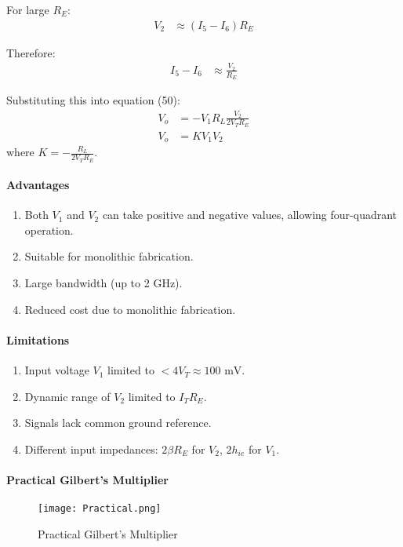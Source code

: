 \documentclass[a4paper,9pt,twoside,openany,twocolumn]{memoir}
\begin{document}
For large \( R_E \):
\begin{align}
V_2 &\approx (I_5 - I_6) R_E \tag{59}
\end{align}

Therefore:
\begin{align}
I_5 - I_6 &\approx \frac{V_2}{R_E} \tag{60}
\end{align}

Substituting this into equation (50):
\begin{align}
V_o &= -V_1 R_L \frac{V_2}{2V_T R_E} \tag{61} \\
V_o &= K V_1 V_2 \tag{62}
\end{align}
where \( K = -\frac{R_L}{2V_T R_E} \).

\paragraph{Advantages}
\begin{enumerate}
    \item Both \( V_1 \) and \( V_2 \) can take positive and negative values, allowing four-quadrant operation.
    \item Suitable for monolithic fabrication.
    \item Large bandwidth (up to 2 GHz).
    \item Reduced cost due to monolithic fabrication.
\end{enumerate}

\paragraph{Limitations}
\begin{enumerate}
    \item Input voltage \( V_1 \) limited to \( < 4V_T \approx 100 \text{ mV} \).
    \item Dynamic range of \( V_2 \) limited to \( I_T R_E \).
    \item Signals lack common ground reference.
    \item Different input impedances: \( 2\beta R_E \) for \( V_2 \), \( 2h_{ie} \) for \( V_1 \).
\end{enumerate}

\paragraph{Practical Gilbert's Multiplier}
\begin{figure}[h]
    \centering
    \texttt{[image: Practical.png]} %
    \caption{Practical Gilbert’s Multiplier}
    \label{fig:Practical}
\end{figure}
\end{document}
